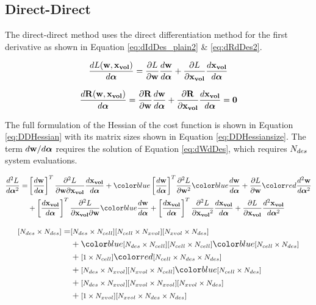 \documentclass[letterpaper,12pt,]{article}
\begin{document}
\newpage
\subsection*{Direct-Direct}

The direct-direct method uses the direct differentiation method for the first derivative as shown in Equation \ref{eq:dIdDes_plain2} \& \ref{eq:dRdDes2}.

\begin{equation}
	\dfrac{dL( \mathbf{w}, \mathbf{x_{vol}} ) }{d\boldsymbol{\alpha}}
	= 
    \dfrac{\partial L}{\partial\mathbf{w}}
	\dfrac{d\mathbf{w}}{d\boldsymbol{\alpha}}
	+
	\dfrac{\partial L}{\partial\mathbf{x_{vol}}}
	\dfrac{d\mathbf{x_{vol}}}{d\boldsymbol{\alpha}}
	\label{eq:dIdDes_plain2}
\end{equation}

\begin{equation}
	\dfrac{d\mathbf{R}( \mathbf{w}, \mathbf{x_{vol}} ) }{d\boldsymbol{\alpha}}
	= 
    \dfrac{\partial\mathbf{R}}{\partial\mathbf{w}}
	\dfrac{d\mathbf{w}}{d\boldsymbol{\alpha}}
	+
	\dfrac{\partial\mathbf{R}}{\partial\mathbf{x_{vol}}}
	\dfrac{d\mathbf{x_{vol}}}{d\boldsymbol{\alpha}}
	= \mathbf{0}
	\label{eq:dRdDes2}
\end{equation}

The full formulation of the Hessian of the cost function is shown in Equation \ref{eq:DDHessian} with its matrix sizes shown in Equation \ref{eq:DDHessiansize}.
The term $d\mathbf{w}/d\boldsymbol{\alpha}$ requires the solution of Equation \ref{eq:dWdDes}, which requires $N_{des}$ system evaluations.

\begin{equation}
\begin{split}
	\DDt{L}{\balfa} 
	=&
	\trans{\Dt{\bw}{\balfa}}
	\ddelm{L}{\bw}{\xvol}
	\Dt{\xvol}{\balfa}
	+
	\blue{\trans{\Dt{\bw}{\balfa}}}
	\ddel{L}{\bw}
	\blue{\Dt{\bw}{\balfa}}
	+
	\del{L}{\bw}
	\red{\DDt{\bw}{\balfa}}
	\\
	&+
	\trans{\Dt{\xvol}{\balfa}}
	\ddelm{L}{\xvol}{\bw}
	\blue{\Dt{\bw}{\balfa}}
	+
	\trans{\Dt{\xvol}{\balfa}}
	\ddel{L}{\xvol}
	\Dt{\xvol}{\balfa}
	+
	\del{L}{\xvol}
	\DDt{\xvol}{\balfa}
\label{eq:DDHessian}
\end{split}
\end{equation}

\begin{equation}
\begin{split}
	\nxn{\ndes}{\ndes}
	=
	&
	\nxn{\ndes}{\ncell}
	\nxn{\ncell}{\nxvol}
	\nxn{\nxvol}{\ndes}
	\\&
	+
	\blue{\nxn{\ndes}{\ncell}}
	\nxn{\ncell}{\ncell}
	\blue{\nxn{\ncell}{\ndes}}
	\\&
	+
	\nxn{1}{\ncell}
	\red{\nxnxn{\ncell}{\ndes}{\ndes}}
	\\&
	+
	\nxn{\ndes}{\nxvol}
	\nxn{\nxvol}{\ncell}
	\blue{\nxn{\ncell}{\ndes}}
	\\&
	+
	\nxn{\ndes}{\nxvol}
	\nxn{\nxvol}{\nxvol}
	\nxn{\nxvol}{\ndes}
	\\&
	+
	\nxn{1}{\nxvol}
	\nxnxn{\nxvol}{\ndes}{\ndes}
\label{eq:DDHessiansize}
\end{split}
\end{equation}
\end{document}
